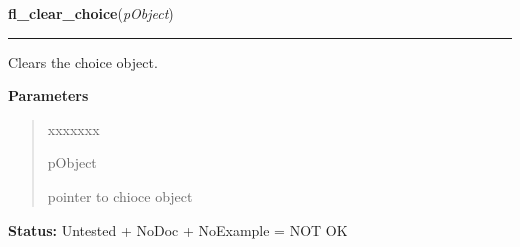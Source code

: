     \label{xformslib:library:fl_clear_choice}

    \vspace{0.5ex}

\hspace{.8\funcindent}\begin{boxedminipage}{\funcwidth}

    \raggedright \textbf{fl\_clear\_choice}(\textit{pObject})

    \vspace{-1.5ex}

    \rule{\textwidth}{0.5\fboxrule}
\setlength{\parskip}{2ex}
    Clears the choice object.

\setlength{\parskip}{1ex}
      \textbf{Parameters}
      \vspace{-1ex}

      \begin{quote}
        \begin{Ventry}{xxxxxxx}

          \item[pObject]

          pointer to chioce object

        \end{Ventry}

      \end{quote}

\textbf{Status:} Untested + NoDoc + NoExample = NOT OK



    \end{boxedminipage}

    \label{xformslib:library:fl_addto_choice}

    \vspace{0.5ex}

